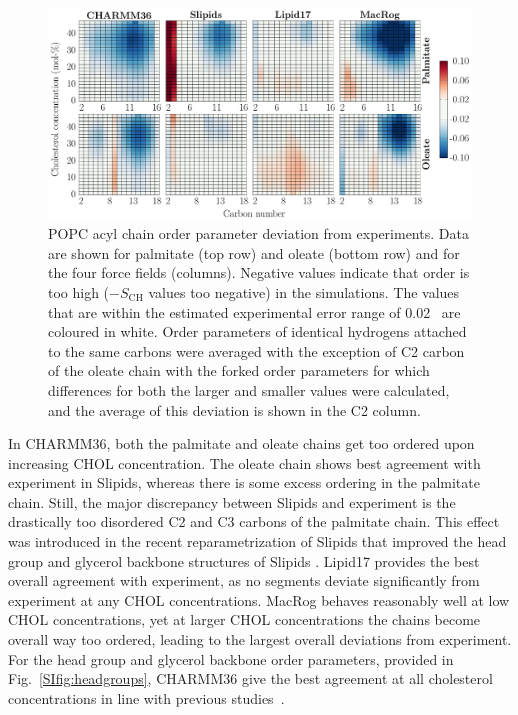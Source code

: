 \documentclass[journal=jctcce]{achemso}
\begin{document}
\begin{figure}[htb!]
  \centering
  \includegraphics[width=\linewidth]{../FIGS/OP_chains.pdf}
  \caption{\label{fig:OPmaps}%
  POPC acyl chain order parameter deviation from experiments. Data are shown for palmitate (top row) and oleate (bottom row) and for the four force fields (columns). Negative values indicate that order is too high ($-S_\mathrm{CH}$ values too negative) in the simulations. The values that are within the estimated experimental error range of 0.02~\cite{ollila16} are coloured in white. Order parameters of identical hydrogens attached to the same carbons were averaged with the exception of C2 carbon of the oleate chain with the forked order parameters for which differences for both the larger and smaller values were calculated, and the average of this deviation is shown in the C2 column.
  }
\end{figure}

In CHARMM36, both the palmitate and oleate chains get too ordered upon increasing CHOL concentration. The oleate chain shows best agreement with experiment in Slipids, whereas there is some excess ordering in the palmitate chain. Still, the major discrepancy between Slipids and experiment is the drastically too disordered C2 and C3 carbons of the palmitate chain. This effect was introduced in the recent reparametrization of Slipids that improved the head group and glycerol backbone structures of Slipids \cite{grote2020optimization}. Lipid17 provides the best overall agreement with experiment, as no segments deviate significantly from experiment at any CHOL concentrations. MacRog behaves reasonably well at low CHOL concentrations, yet at larger CHOL concentrations the chains become overall way too ordered, leading to the largest overall deviations from experiment. For the head group and glycerol backbone order parameters, provided in Fig.~\ref{SIfig:headgroups}, CHARMM36 give the best agreement at all cholesterol concentrations in line with previous studies~\cite{botan15,antila2019headgroup}.
\end{document}
